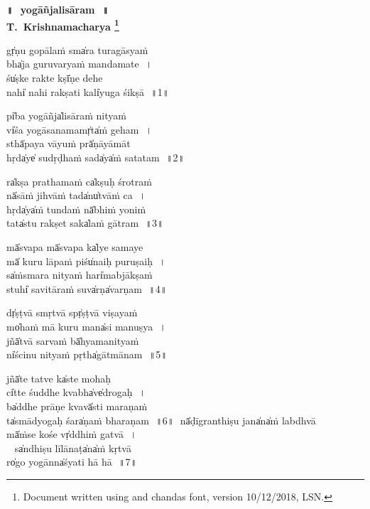 \documentclass[parskip, DIV=14, pagenumber=head,top]{scrartcl}
\renewcommand{\thefootnote}{\fnsymbol{footnote}} %
\begin{document}

\vspace{-1.5cm}

\begin{center}
\textbf{{\Huge॥\,~yogāñjalisāram\,~॥\\
\vspace{0.5cm}
\LARGE T.~Krishnamacharya
\LARGE\let\thefootnote\relax\footnote{\color{lightgray} Document written using \XeLaTeX{} and chandas font, version 10/12/2018, LSN.}}}
\end{center}
\Large

\centering	

gṛ̍ṇu gopālaṁ sma̍ra turagāsyaṁ\\
bha̍ja guruvaryaṁ mandamate\,~।\\
śu̍ṣke rakte kṣī̍ṇe dehe\\
na॒hi̍ nahi rakṣati ka॒li̍yuga śikṣā\,~॥1॥

pi̍ba yogāñja̍lisāraṁ nityaṁ\\
vi̍śa yogāsanama॒mṛ̍ta̍ṁ geham\,~।\\
sthā̍paya vāyuṁ prā̍ṇāyāmāt\\
hṛ॒da̍ye̍ sudṛḍhaṁ sa॒da̍ya̍ṁ satatam\,~॥2॥

ra̍kṣa prathamaṁ ca̍kṣuḥ śrotraṁ\\
nā̍sāṁ jihvāṁ ta॒da̍nu̍tvāṁ ca\,~।\\
hṛ॒da̍ya̍ṁ tundaṁ nā̍bhiṁ yoniṁ\\
ta॒ta̍stu rakṣet sa॒ka̍laṁ gātram\,~॥3॥

mā̍svapa॒ mā̍svapa॒ ka̍lye samaye\\
mā̍ kuru lāpaṁ pi॒śu̍naiḥ puruṣaiḥ\,~।\\
sa̍ṁsmara nityaṁ ha॒ri̍mabjākṣaṁ\\
stu॒hi̍ savitāraṁ su॒va̍rṇa̍varṇam\,~॥4॥

dṛ̍ṣṭvā smṛtvā spṛ̍ṣṭvā viṣayaṁ\\
mo̍haṁ mā kuru ma॒na̍si manuṣya\,~।\\
jñā̍tvā sarvaṁ bā̍hyamanityaṁ\\
ni̍ścinu nityaṁ pṛ॒tha̍gātmānam\,~॥5॥

\newpage 

jñā̍te tatve ka̍ste mohaḥ\\
ci̍tte śuddhe kva॒bha̍ve̍drogaḥ\,~।\\
ba̍ddhe prāṇe kva॒vā̍sti maraṇaṁ\\
ta̍smādyogaḥ śa॒ra̍ṇaṁ bharaṇam\,~॥6॥
nā̍ḍīgranthiṣu ja॒na̍na̍ṁ labdhvā \\
mā̍ṁse kośe vṛ̍ddhiṁ gatvā\,~।\\ 
sa̍ndhiṣu līlāna॒ṭa̍na̍ṁ kṛtvā\\
ro̍go yogānna̍śyati hā hā\,~॥7॥	
\end{document}
